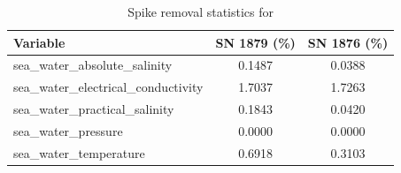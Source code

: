 \begin{table}[h]
\centering
\caption{Spike removal statistics for \projectname{} \casenumber{}}
\label{tab:spike_stats}
\begin{tabular}{|l|c|c|}
\hline
Variable & SN 1879 (\%) & SN 1876 (\%) \\
\hline
sea\_water\_absolute\_salinity & 0.1487 & 0.0388 \\
sea\_water\_electrical\_conductivity & 1.7037 & 1.7263 \\
sea\_water\_practical\_salinity & 0.1843 & 0.0420 \\
sea\_water\_pressure & 0.0000 & 0.0000 \\
sea\_water\_temperature & 0.6918 & 0.3103 \\
\hline
\end{tabular}
\end{table}

